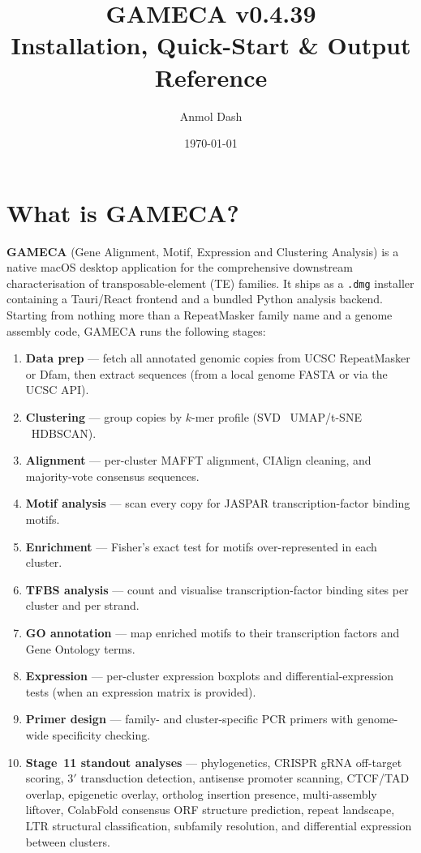 \documentclass[11pt]{article}
\title{\textbf{GAMECA} v0.4.39\\[4pt]
       \large Installation, Quick-Start \& Output Reference}
\author{Anmol Dash}
\date{\today}
\begin{document}
\maketitle
\tableofcontents
\newpage

\section{What is GAMECA?}

\textbf{GAMECA} (Gene Alignment, Motif, Expression and Clustering Analysis)
is a native macOS desktop application for the comprehensive downstream
characterisation of transposable-element (TE) families. It ships as a
\texttt{.dmg} installer containing a Tauri/React frontend and a bundled
Python analysis backend. Starting from nothing more than a RepeatMasker
family name and a genome assembly code, GAMECA runs the following stages:

\begin{enumerate}[itemsep=2pt]
  \item \textbf{Data prep} --- fetch all annotated genomic copies from
        UCSC RepeatMasker or Dfam, then extract sequences (from a local
        genome FASTA or via the UCSC API).
  \item \textbf{Clustering} --- group copies by $k$-mer profile
        (SVD \textrightarrow\ UMAP/t-SNE \textrightarrow\ HDBSCAN).
  \item \textbf{Alignment} --- per-cluster MAFFT alignment, CIAlign
        cleaning, and majority-vote consensus sequences.
  \item \textbf{Motif analysis} --- scan every copy for JASPAR
        transcription-factor binding motifs.
  \item \textbf{Enrichment} --- Fisher's exact test for motifs
        over-represented in each cluster.
  \item \textbf{TFBS analysis} --- count and visualise transcription-factor
        binding sites per cluster and per strand.
  \item \textbf{GO annotation} --- map enriched motifs to their
        transcription factors and Gene Ontology terms.
  \item \textbf{Expression} --- per-cluster expression boxplots and
        differential-expression tests (when an expression matrix is
        provided).
  \item \textbf{Primer design} --- family- and cluster-specific PCR
        primers with genome-wide specificity checking.
  \item \textbf{Stage~11 standout analyses} --- phylogenetics, CRISPR
        gRNA off-target scoring, 3$'$ transduction detection, antisense
        promoter scanning, CTCF/TAD overlap, epigenetic overlay, ortholog
        insertion presence, multi-assembly liftover, ColabFold consensus
        ORF structure prediction, repeat landscape, LTR structural
        classification, subfamily resolution, and differential expression
        between clusters.
\end{enumerate}
\end{document}
